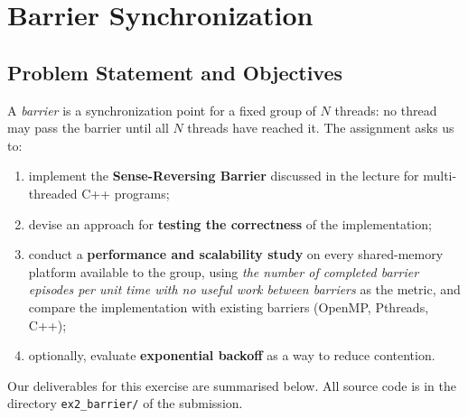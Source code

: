 
\section{Barrier Synchronization}
\label{sec:ex2}

\subsection{Problem Statement and Objectives}
\label{sec:ex2-objectives}

A \emph{barrier} is a synchronization point for a fixed group of $N$ threads:
no thread may pass the barrier until all $N$ threads have reached it. The
assignment asks us to:

\begin{enumerate}
    \item implement the \textbf{Sense-Reversing Barrier} discussed in the
          lecture for multi-threaded C++ programs;
    \item devise an approach for \textbf{testing the correctness} of the
          implementation;
    \item conduct a \textbf{performance and scalability study} on every
          shared-memory platform available to the group, using
          \emph{the number of completed barrier episodes per unit time with
          no useful work between barriers} as the metric, and compare the
          implementation with existing barriers (OpenMP, Pthreads, C++);
    \item optionally, evaluate \textbf{exponential backoff} as a way to
          reduce contention.
\end{enumerate}

Our deliverables for this exercise are summarised below. All source code is
in the directory \texttt{ex2\_barrier/} of the submission.

